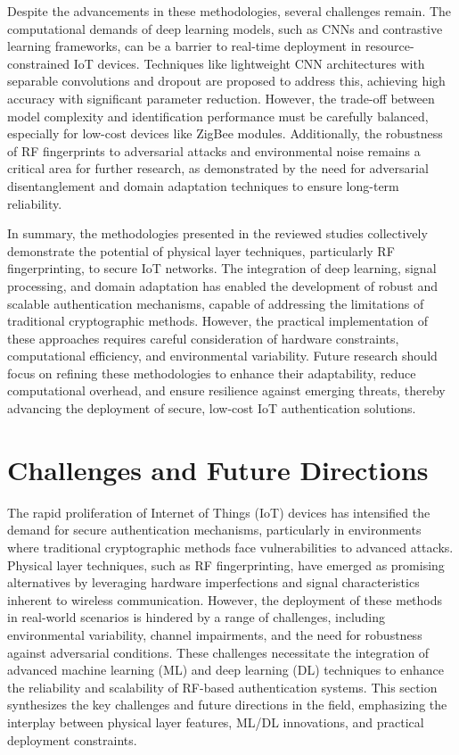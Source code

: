 \documentclass[conference]{IEEEtran}
\begin{document}
Despite the advancements in these methodologies, several challenges remain. The computational demands of deep learning models, such as CNNs and contrastive learning frameworks, can be a barrier to real-time deployment in resource-constrained IoT devices. Techniques like lightweight CNN architectures with separable convolutions and dropout are proposed to address this, achieving high accuracy with significant parameter reduction. However, the trade-off between model complexity and identification performance must be carefully balanced, especially for low-cost devices like ZigBee modules. Additionally, the robustness of RF fingerprints to adversarial attacks and environmental noise remains a critical area for further research, as demonstrated by the need for adversarial disentanglement and domain adaptation techniques to ensure long-term reliability.  

In summary, the methodologies presented in the reviewed studies collectively demonstrate the potential of physical layer techniques, particularly RF fingerprinting, to secure IoT networks. The integration of deep learning, signal processing, and domain adaptation has enabled the development of robust and scalable authentication mechanisms, capable of addressing the limitations of traditional cryptographic methods. However, the practical implementation of these approaches requires careful consideration of hardware constraints, computational efficiency, and environmental variability. Future research should focus on refining these methodologies to enhance their adaptability, reduce computational overhead, and ensure resilience against emerging threats, thereby advancing the deployment of secure, low-cost IoT authentication solutions.

\section{Challenges and Future Directions}

The rapid proliferation of Internet of Things (IoT) devices has intensified the demand for secure authentication mechanisms, particularly in environments where traditional cryptographic methods face vulnerabilities to advanced attacks. Physical layer techniques, such as RF fingerprinting, have emerged as promising alternatives by leveraging hardware imperfections and signal characteristics inherent to wireless communication. However, the deployment of these methods in real-world scenarios is hindered by a range of challenges, including environmental variability, channel impairments, and the need for robustness against adversarial conditions. These challenges necessitate the integration of advanced machine learning (ML) and deep learning (DL) techniques to enhance the reliability and scalability of RF-based authentication systems. This section synthesizes the key challenges and future directions in the field, emphasizing the interplay between physical layer features, ML/DL innovations, and practical deployment constraints.  
\end{document}
